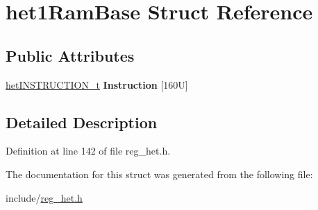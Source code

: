 \hypertarget{structhet1RamBase}{}\section{het1\+Ram\+Base Struct Reference}
\label{structhet1RamBase}
\subsection*{Public Attributes}
\begin{DoxyCompactItemize}
\item 
\mbox{\label{structhet1RamBase_a0a42e64d27867081d89f37ff139c5d44}} 
\mbox{\hyperlink{reg__het_8h_a51adb6af5a27a385e04c8750e3645738}{het\+I\+N\+S\+T\+R\+U\+C\+T\+I\+O\+N\+\_\+t}} {\bfseries Instruction} \mbox{[}160\+U\mbox{]}
\end{DoxyCompactItemize}


\subsection{Detailed Description}


Definition at line 142 of file reg\+\_\+het.\+h.



The documentation for this struct was generated from the following file\+:\begin{DoxyCompactItemize}
\item 
include/\mbox{\hyperlink{reg__het_8h}{reg\+\_\+het.\+h}}\end{DoxyCompactItemize}
